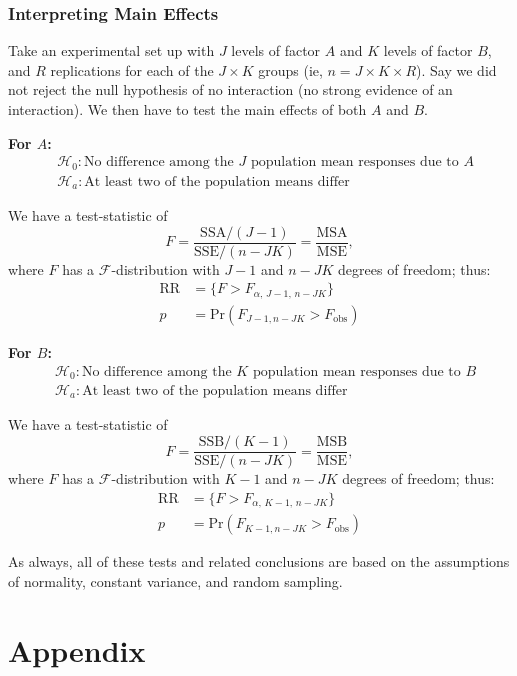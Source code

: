 \documentclass[12pt]{article}
\begin{document}
\subsubsection{Interpreting Main Effects}

Take an experimental set up with $J$ levels of factor $A$ and $K$ levels of factor $B$, and $R$ replications for each of the $J\times K$ groups (ie, $n = J \times K \times R$). Say we did not reject the null hypothesis of no interaction (no strong evidence of an interaction). We then have to test the main effects of both $A$ and $B$.

\textbf{For $A$:}
\begin{align*}
    &\mathcal{H}_0: \text{No difference among the } J \text{ population mean responses due to } A\\
    &\mathcal{H}_a: \text{At least two of the population means differ}
\end{align*}

We have a test-statistic of \[F = \frac{\text{SSA}/(J-1)}{\text{SSE}/(n-JK)} = \frac{\text{MSA}}{\text{MSE}},\] where $F$ has a $\mathcal{F}$-distribution with $J-1$ and $n-JK$ degrees of freedom; thus: \begin{align*}
    \text{RR} &= \{F > F_{\alpha,\,J-1,\, n-JK}\}\\
    p &= \text{Pr}(F_{J-1, n-JK} > F_{\text{obs}})
\end{align*}

\textbf{For $B$:}
\begin{align*}
    &\mathcal{H}_0: \text{No difference among the } K \text{ population mean responses due to } B\\
    &\mathcal{H}_a: \text{At least two of the population means differ}
\end{align*}

We have a test-statistic of \[F = \frac{\text{SSB}/(K-1)}{\text{SSE}/(n-JK)} = \frac{\text{MSB}}{\text{MSE}},\] where $F$ has a $\mathcal{F}$-distribution with $K-1$ and $n-JK$ degrees of freedom; thus: \begin{align*}
    \text{RR} &= \{F > F_{\alpha,\,K-1,\, n-JK}\}\\
    p &= \text{Pr}(F_{K-1, n-JK} > F_{\text{obs}})
\end{align*}

As always, all of these tests and related conclusions are based on the assumptions of normality, constant variance, and random sampling.
\newpage
\section{Appendix}
\end{document}
